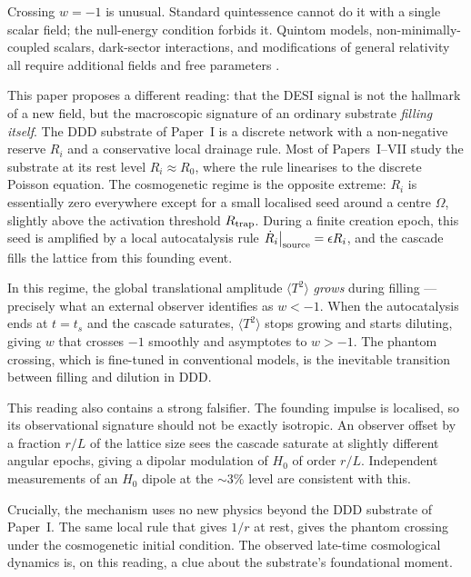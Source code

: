\documentclass[11pt,a4paper]{article}
\begin{document}
Crossing $w = -1$ is unusual. Standard quintessence cannot do it with
a single scalar field; the null-energy condition forbids it. Quintom
models, non-minimally-coupled scalars, dark-sector interactions, and
modifications of general relativity all require additional fields and
free parameters \cite{lodha2025, gialamas2025, adam2025}.

This paper proposes a different reading: that the DESI signal is not
the hallmark of a new field, but the macroscopic signature of an
ordinary substrate \emph{filling itself}. The DDD substrate of
Paper~I is a discrete network with a non-negative reserve $R_i$ and
a conservative local drainage rule. Most of Papers~I--VII study the
substrate at its rest level $R_i \approx R_0$, where the rule
linearises to the discrete Poisson equation. The cosmogenetic regime
is the opposite extreme: $R_i$ is essentially zero everywhere except
for a small localised seed around a centre $\Omega$, slightly above
the activation threshold $R_{\rm trap}$. During a finite creation
epoch, this seed is amplified by a local autocatalysis rule
$\dot R_i\big|_{\rm source} = \epsilon R_i$, and the cascade fills
the lattice from this founding event.

In this regime, the global translational amplitude $\langle T^2\rangle$
\emph{grows} during filling --- precisely what an external observer
identifies as $w < -1$. When the autocatalysis ends at $t = t_s$ and
the cascade saturates, $\langle T^2\rangle$ stops growing and starts
diluting, giving $w$ that crosses $-1$ smoothly and asymptotes to
$w > -1$. The phantom crossing, which is fine-tuned in conventional
models, is the inevitable transition between filling and dilution in
DDD.

This reading also contains a strong falsifier. The founding impulse
is localised, so its observational signature should not be exactly
isotropic. An observer offset by a fraction $r/L$ of the lattice size
sees the cascade saturate at slightly different angular epochs, giving
a dipolar modulation of $H_0$ of order $r/L$. Independent measurements
of an $H_0$ dipole at the $\sim 3\%$ level \cite{boubel2024} are
consistent with this.

Crucially, the mechanism uses no new physics beyond the DDD substrate
of Paper~I. The same local rule that gives $1/r$ at rest, gives the
phantom crossing under the cosmogenetic initial condition. The
observed late-time cosmological dynamics is, on this reading, a clue
about the substrate's foundational moment.
\end{document}
